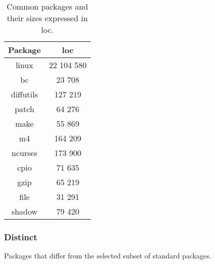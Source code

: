 \begin{table}[!h]
    \centering
    \begin{tabular}{|c||c|}
        \hline
        Package & \gls{loc} \\
        \hline
        \hline
        linux \cite{linux} & 22 104 580 \\
        \hline
        bc \cite{bc} & 23 708 \\
        \hline        
        diffutils \cite{diffutils} & 127 219 \\
        \hline
        patch \cite{patch} & 64 276 \\
        \hline
        make \cite{make} & 55 869 \\
        \hline
        m4 \cite{m4} & 164 209 \\
        \hline
        ncurses \cite{ncurses} & 173 900 \\
        \hline
        cpio \cite{cpio} & 71 635 \\
        \hline
        gzip\cite{gzip} & 65 219 \\
        \hline
        file\cite{file} & 31 291 \\
        \hline
        shadow\cite{shadow} & 79 420 \\
        \hline
    \end{tabular}
    \caption{Common packages and their sizes expressed in \gls{loc}.}
\end{table}

\newpage

\subsubsection{Distinct}

Packages that differ from the selected subset of standard packages.

